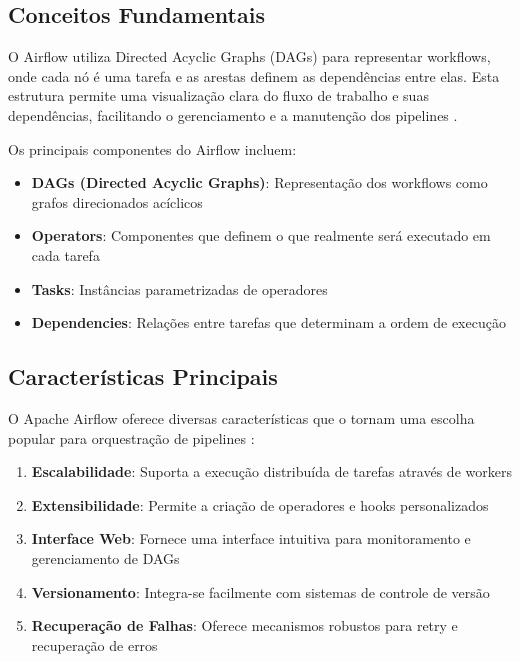 \subsection{Conceitos Fundamentais}

O Airflow utiliza Directed Acyclic Graphs (DAGs) para representar workflows, onde cada nó é uma tarefa e as arestas definem as dependências entre elas. Esta estrutura permite uma visualização clara do fluxo de trabalho e suas dependências, facilitando o gerenciamento e a manutenção dos pipelines \cite{garcia2021airflow}.

Os principais componentes do Airflow incluem:

\begin{itemize}
\item \textbf{DAGs (Directed Acyclic Graphs)}: Representação dos workflows como grafos direcionados acíclicos
\item \textbf{Operators}: Componentes que definem o que realmente será executado em cada tarefa
\item \textbf{Tasks}: Instâncias parametrizadas de operadores
\item \textbf{Dependencies}: Relações entre tarefas que determinam a ordem de execução
\end{itemize}

\subsection{Características Principais}

O Apache Airflow oferece diversas características que o tornam uma escolha popular para orquestração de pipelines \cite{kumar2022apache}:

\begin{enumerate}
\item \textbf{Escalabilidade}: Suporta a execução distribuída de tarefas através de workers
\item \textbf{Extensibilidade}: Permite a criação de operadores e hooks personalizados
\item \textbf{Interface Web}: Fornece uma interface intuitiva para monitoramento e gerenciamento de DAGs
\item \textbf{Versionamento}: Integra-se facilmente com sistemas de controle de versão
\item \textbf{Recuperação de Falhas}: Oferece mecanismos robustos para retry e recuperação de erros
\end{enumerate}

